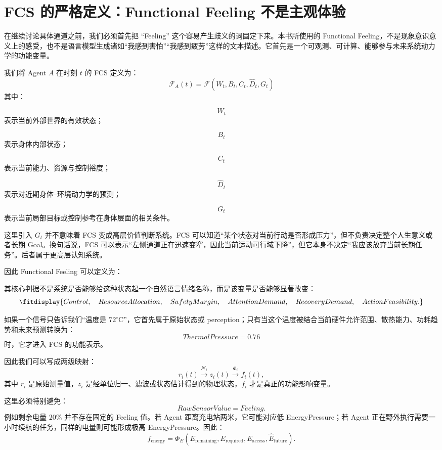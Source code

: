 \section{FCS 的严格定义：Functional Feeling 不是主观体验}

在继续讨论具体通道之前，我们必须首先把 ``Feeling'' 这个容易产生歧义的词固定下来。本书所使用的 Functional Feeling，不是现象意识意义上的感受，也不是语言模型生成诸如“我感到害怕”“我感到疲劳”这样的文本描述。它首先是一个可观测、可计算、能够参与未来系统动力学的功能变量。

我们将 Agent $A$ 在时刻 $t$ 的 FCS 定义为：
\[
\boxed{
\mathcal F_A(t)
=
\mathcal{F}
\left(
W_t,
B_t,
C_t,
\hat D_t,
G_t
\right)
}
\]
其中：

\[
W_t
\]
表示当前外部世界的有效状态；

\[
B_t
\]
表示身体内部状态；

\[
C_t
\]
表示当前能力、资源与控制裕度；

\[
\hat D_t
\]
表示对近期身体--环境动力学的预测；

\[
G_t
\]
表示当前局部目标或控制参考在身体层面的相关条件。

这里引入 $G_t$ 并不意味着 FCS 变成高层价值判断系统。FCS 可以知道“某个状态对当前行动是否形成压力”，但不负责决定整个人生意义或者长期 Goal。换句话说，FCS 可以表示“左侧通道正在迅速变窄，因此当前运动可行域下降”，但它本身不决定“我应该放弃当前长期任务”。后者属于更高层认知系统。

因此 Functional Feeling 可以定义为：
\begin{statementbox}
\centering
{}
\end{statementbox}
其核心判据不是系统是否能够给这种状态起一个自然语言情绪名称，而是该变量是否能够显著改变：
\[
\fitdisplay{
Control,
\quad
ResourceAllocation,
\quad
SafetyMargin,
\quad
AttentionDemand,
\quad
RecoveryDemand,
\quad
ActionFeasibility.
}
\]

如果一个信号只告诉我们“温度是 $72^\circ$C”，它首先属于原始状态或 perception；只有当这个温度被结合当前硬件允许范围、散热能力、功耗趋势和未来预测转换为：
\[
ThermalPressure=0.76
\]
时，它才进入 FCS 的功能表示。

因此我们可以写成两级映射：
\[
r_i(t)
\xrightarrow{\mathcal N_i}
z_i(t)
\xrightarrow{\Phi_i}
f_i(t),
\]
其中 $r_i$ 是原始测量值，$z_i$ 是经单位归一、滤波或状态估计得到的物理状态，$f_i$ 才是真正的功能影响变量。

这里必须特别避免：
\[
RawSensorValue=Feeling.
\]
例如剩余电量 $20\%$ 并不存在固定的 Feeling 值。若 Agent 距离充电站两米，它可能对应低 EnergyPressure；若 Agent 正在野外执行需要一小时续航的任务，同样的电量则可能形成极高 EnergyPressure。因此：
\[
f_{\mathrm{energy}}
=
\Phi_E
(
E_{\mathrm{remaining}},
E_{\mathrm{required}},
E_{\mathrm{access}},
\hat E_{\mathrm{future}}
).
\]

